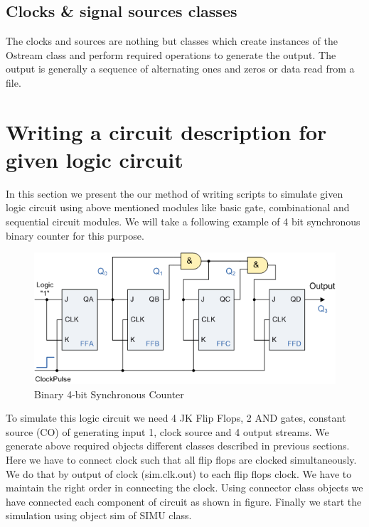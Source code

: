 \documentclass[a4paper,12pt]{article}
\begin{document}
\subsection{Clocks \& signal sources classes}
The clocks and sources are nothing but classes which create instances of the Ostream class and perform required operations to generate the output. The output is generally a sequence of alternating ones and zeros or data read from a file.
 


\section{Writing a circuit description for given logic circuit}

In this section we present the our method of writing scripts to simulate given logic circuit using above mentioned modules like basic gate, combinational and 
sequential circuit modules. We will take a following example of 4 bit synchronous binary counter for this purpose.  

\begin{figure}[h]
\centering
\includegraphics[scale=0.6]{cou4.png}%
\caption{Binary 4-bit Synchronous Counter}
\end{figure}

To simulate this logic circuit we need 4 JK Flip Flops, 2 AND gates, constant source (CO) of generating input 1, clock source and 4 output streams.
We generate above required objects different classes described in previous sections. Here we have to connect clock such that all flip flops are clocked 
simultaneously. We do that by output of clock (sim.clk.out) to each flip flops clock. We have to maintain the right order in connecting the clock. Using connector class objects 
we have connected each component of circuit as shown in figure. Finally we start the simulation using object sim of SIMU class. 
\end{document}
